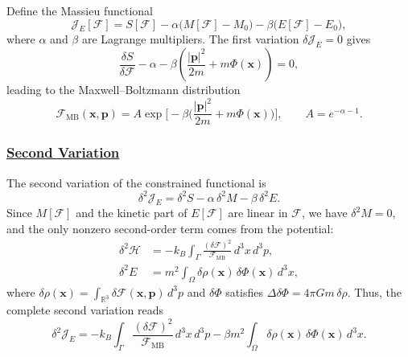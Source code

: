 \documentclass[12pt,a4paper]{article}
\numberwithin{equation}{section}
\begin{document}
Define the Massieu functional
\begin{equation}
\mathcal{J}_{E}[\mathcal{F}] = S[\mathcal{F}] - \alpha \big( M[\mathcal{F}] - M_0 \big) - \beta \big( E[\mathcal{F}] - E_0 \big),
\end{equation}
where $\alpha$ and $\beta$ are Lagrange multipliers.
The first variation $\delta \mathcal{J}_{E} = 0$ gives
\begin{equation}
\frac{\delta S}{\delta \mathcal{F}} - \alpha - \beta \left( \frac{|\mathbf{p}|^2}{2m} + m \Phi(\mathbf{x}) \right) = 0,
\end{equation}
leading to the Maxwell--Boltzmann distribution
\begin{equation}
\mathcal{F}_{\mathrm{MB}}(\mathbf{x}, \mathbf{p}) = A \exp\Big[-\beta \Big( \frac{|\mathbf{p}|^2}{2m} + m \Phi(\mathbf{x}) \Big) \Big],
\qquad A = e^{-\alpha - 1}.
\end{equation}

\subsubsection*{\underline{Second Variation}}

The second variation of the constrained functional is
\begin{equation}
\delta^2 \mathcal{J}_{E} = \delta^2 S - \alpha \, \delta^2 M - \beta \, \delta^2 E.
\end{equation}
Since $M[\mathcal{F}]$ and the kinetic part of $E[\mathcal{F}]$ are linear in $\mathcal{F}$, we have $\delta^2 M = 0$, and the only nonzero second-order term comes from the potential:
\begin{align}
\delta^2 \mathcal{H} &= - k_B \int_{\Gamma} \frac{(\delta \mathcal{F})^2}{\mathcal{F}_{\mathrm{MB}}} \, d^3x \, d^3p, \\
\delta^2 E &= m^2 \int_{\Omega} \delta \rho(\mathbf{x}) \, \delta \Phi(\mathbf{x}) \, d^3x,
\end{align}
where $\delta \rho(\mathbf{x}) = \int_{\mathbb{R}^3} \delta \mathcal{F}(\mathbf{x}, \mathbf{p}) \, d^3p$ and $\delta \Phi$ satisfies $\Delta \delta \Phi = 4 \pi G m \, \delta \rho$.
Thus, the complete second variation reads
\begin{equation}
\boxed{
\delta^2 \mathcal{J}_{E} = - k_B \int_{\Gamma} \frac{(\delta \mathcal{F})^2}{\mathcal{F}_{\mathrm{MB}}} \, d^3x \, d^3p
- \beta m^2 \int_{\Omega} \delta \rho(\mathbf{x}) \, \delta \Phi(\mathbf{x}) \, d^3x.
}
\end{equation}
\end{document}
